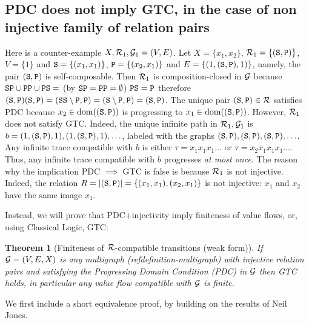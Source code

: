 \documentclass{lmcs}
\newtheorem{theorem}{Theorem}[section]
\begin{document}
\subsection{PDC does not imply GTC, in the case of non injective family of relation pairs}
\label{subsubsection-counterexample-PDC-GTC}
Here is a counter-example $X, {\mathcal R}_1, {\mathcal G}_1=(V,E)$.
Let $X = \{x_1,x_2\}$, ${\mathcal R}_1=\{({\tt S},{\tt P})\}$, $V=\{1\}$
and ${\tt S} =\{(x_1,x_1)\}$, ${\tt P} =\{(x_2,x_1)\}$ and
$E = \{(1, ({\tt S},{\tt P}), 1)\}$, 
namely, the pair $({\tt S},{\tt P})$ is self-composable. 
Then ${\mathcal R}_1$ is composition-closed in ${\mathcal G}$ because 
$
{\tt S}{\tt P} \cup {\tt P}{\tt P} \cup {\tt P}{\tt S} =
$ (by ${\tt S}{\tt P} = {\tt P}{\tt P} = \emptyset$) $
{\tt P}{\tt S} = 
{\tt P}
$
therefore
$
({\tt S},{\tt P})({\tt S},{\tt P}) = 
({\tt S}{\tt S} \setminus {\tt P}, {\tt P}) = 
({\tt S} \setminus {\tt P},{\tt P}) = 
({\tt S},{\tt P})
$.
The unique pair $({\tt S},{\tt P}) \in {\mathcal R}$ satisfies PDC 
because $x_2 \in {\rm dom}(({\tt S},{\tt P}))$
is progressing to  $x_1 \in {\rm dom}(({\tt S},{\tt P}))$. However, ${\mathcal R}_1$
does not satisfy GTC. Indeed, the unique infinite path in ${\mathcal R}_1,{\mathcal G}_1$ is 
$b = (1, ({\tt S},{\tt P}), 1), (1, ({\tt S},{\tt P}), 1), \ldots$, 
labeled with the graphs $({\tt S},{\tt P}),({\tt S},{\tt P}),({\tt S},{\tt P}),\ldots$.
Any infinite trace compatible with $b$ is either
$\tau = x_1 x_1 x_1 \ldots$ or $\tau = x_2 x_1 x_1 x_1 \ldots$. Thus, any infinite
trace compatible with $b$ progresses \emph{at most once}. 
The reason why the implication PDC $\implies$ GTC is false is because 
${\mathcal R}_1$ is not injective. Indeed, the relation 
$R = {| ({\tt S},{\tt P}) |} = \{(x_1,x_1), (x_2,x_1)\}$ is not injective:
$x_1$ and $x_2$ have the same image $x_1$.


Instead, we will prove that PDC+injectivity imply finiteness of value flows,
or, using Classical Logic, GTC:

\begin{theorem}[Finiteness of ${\mathcal R}$-compatible transitions (weak form)]
\label{theorem-finiteness-value-flow-1}
If ${\mathcal G}=(V,E,X)$ is any multigraph (ref{definition-multigraph})
with \emph{injective} relation pairs 
and satisfying the Progressing Domain Condition (PDC)  in ${\mathcal G}$
then GTC holds, in particular any value flow compatible with ${\mathcal G}$ is finite.
\end{theorem}


We first include a short equivalence proof, by building on the results of Neil Jones.
\end{document}
